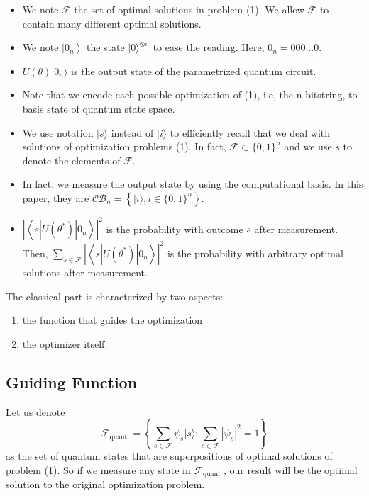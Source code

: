 \begin{remark}
    \begin{itemize}
    \item We note $\mathcal{F}$ the set of optimal solutions in problem (1). We allow $\mathcal{F}$ to contain many different optimal solutions.
    \item We note $\left|0_{n}\right\rangle$ the state $|0\rangle^{\otimes n}$ to ease the reading. Here, $0_{n}=000\dots0.$
    \item $U\left(\theta\right)| 0_{n}\rangle$ is the output state of the parametrized quantum circuit.
    \item Note that we encode each possible optimization of (1), i.e, the n-bitstring, to basis state of quantum state space.
    \item We use notation $|s\rangle$ instead of $|i\rangle$ to efficiently recall that we deal with solutions of optimization problems (1). In fact, $\mathcal{F} \subset \{0,1\}^{n}$ and we use $s$ to denote the elements of $\mathcal{F}.$
    \item In fact, we measure the output state by using the computational basis. In this paper, they are $\mathcal{C B}_{n}=\left\{|i\rangle, i \in\{0,1\}^{n}\right\}$.
    \item $\left|\left\langle s\left|U\left(\theta^*\right)\right| 0_n\right\rangle\right|^2$ is the probability with outcome $s$ after measurement. Then, $\sum_{s \in \mathcal{F}}\left|\left\langle s\left|U\left(\theta^{*}\right)\right| 0_{n}\right\rangle\right|^{2}$ is the probability with arbitrary optimal solutions after measurement.
    \end{itemize}
\end{remark}

The classical part is characterized by two aspects: 
\begin{enumerate}
    \item the function that guides the optimization
    \item the optimizer itself.
\end{enumerate}

\subsection{Guiding Function}

Let us denote 
\begin{equation}
    \mathcal{F}_{\text {quant }}=\left\{\sum_{s \in \mathcal{F}} \psi_{s}|s\rangle: \sum_{s \in \mathcal{F}}\left|\psi_{s}\right|^{2}=1\right\}
\end{equation}
as the set of quantum states that are superpositions of optimal solutions of problem (1). So if we measure any state in $\mathcal{F}_{\text {quant }}$, our result will be the optimal solution to the original optimization problem.

